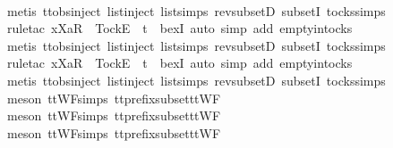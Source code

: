 \begin{isabellebody}
\ \ \ \ \ \ \ \ \ \ \ \isamarkupfalse%
\ {\isacharparenleft}metis\ ttobs{\isachardot}inject{\isacharparenleft}{}{\isacharparenright}\ list{\isachardot}inject\ list{\isachardot}simps{\isacharparenleft}{}{\isacharparenright}\ rev{\isacharunderscore}subsetD\ subsetI\ tocks{\isachardot}simps{\isacharparenright}\isanewline
\ \ \ \ \isamarkupfalse%
\ {\isacharparenleft}rule{\isacharunderscore}tac\ x{\isacharequal}{\isachardoublequoteopen}{\isacharbrackleft}Xa{\isacharbrackright}\isactrlsub R\ {\isacharhash}\ {\isacharbrackleft}Tock{\isacharbrackright}\isactrlsub E\ {\isacharhash}\ t{\isachardoublequoteclose}\ \ bexI{\isacharcomma}\ auto\ simp\ add{\isacharcolon}\ empty{\isacharunderscore}in{\isacharunderscore}tocks{\isacharparenright}\isanewline
\ \ \ \ \isamarkupfalse%
\ {\isacharparenleft}metis\ ttobs{\isachardot}inject{\isacharparenleft}{}{\isacharparenright}\ list{\isachardot}inject\ list{\isachardot}simps{\isacharparenleft}{}{\isacharparenright}\ rev{\isacharunderscore}subsetD\ subsetI\ tocks{\isachardot}simps{\isacharparenright}\isanewline
\ \ \ \ \isamarkupfalse%
\ {\isacharparenleft}rule{\isacharunderscore}tac\ x{\isacharequal}{\isachardoublequoteopen}{\isacharbrackleft}Xa{\isacharbrackright}\isactrlsub R\ {\isacharhash}\ {\isacharbrackleft}Tock{\isacharbrackright}\isactrlsub E\ {\isacharhash}\ t{\isachardoublequoteclose}\ \ bexI{\isacharcomma}\ auto\ simp\ add{\isacharcolon}\ empty{\isacharunderscore}in{\isacharunderscore}tocks{\isacharparenright}\isanewline
\ \ \ \ \isamarkupfalse%
\ {\isacharparenleft}metis\ ttobs{\isachardot}inject{\isacharparenleft}{}{\isacharparenright}\ list{\isachardot}inject\ list{\isachardot}simps{\isacharparenleft}{}{\isacharparenright}\ rev{\isacharunderscore}subsetD\ subsetI\ tocks{\isachardot}simps{\isacharparenright}\isanewline
\ \ \ \ \isamarkupfalse%
\ {\isacharparenleft}meson\ ttWF{\isachardot}simps{\isacharparenleft}{}{}{\isacharparenright}\ tt{\isacharunderscore}prefix{\isacharunderscore}subset{\isacharunderscore}ttWF{\isacharparenright}\isanewline
\ \ \ \ \isamarkupfalse%
\ {\isacharparenleft}meson\ ttWF{\isachardot}simps{\isacharparenleft}{}{}{\isacharparenright}\ tt{\isacharunderscore}prefix{\isacharunderscore}subset{\isacharunderscore}ttWF{\isacharparenright}\isanewline
\ \ \ \ \isamarkupfalse%
\ {\isacharparenleft}meson\ ttWF{\isachardot}simps{\isacharparenleft}{}{}{\isacharparenright}\ tt{\isacharunderscore}prefix{\isacharunderscore}subset{\isacharunderscore}ttWF{\isacharparenright}\isanewline

\end{isabellebody}
